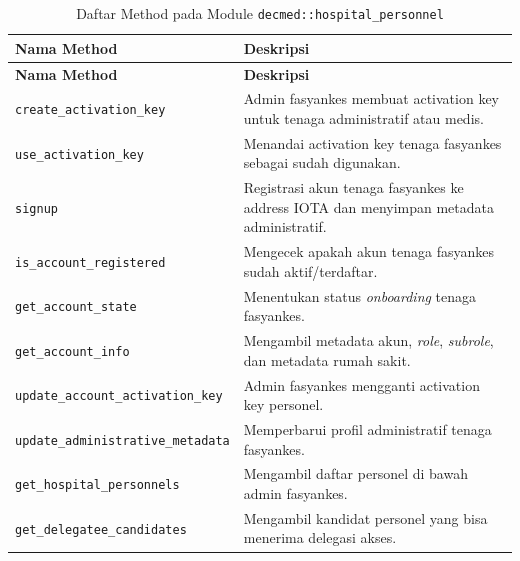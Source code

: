 \begin{longtable}{|Y{0.45\textwidth}|Y{0.47\textwidth}|}
	\caption{Daftar Method pada Module \texttt{decmed::hospital\_personnel}}
	\label{tab:daftar-method-decmed-hospital-personnel}                                                                                \\
	\hline
	\textbf{Nama Method}                      & \textbf{Deskripsi}                                                                     \\
	\hline
	\endfirsthead
	\hline
	\textbf{Nama Method}                      & \textbf{Deskripsi}                                                                     \\
	\hline
	\endhead

	\texttt{create\_activation\_key}          & Admin fasyankes membuat activation key untuk tenaga administratif atau medis.          \\ \hline
	\texttt{use\_activation\_key}             & Menandai activation key tenaga fasyankes sebagai sudah digunakan.                      \\ \hline
	\texttt{signup}                           & Registrasi akun tenaga fasyankes ke address IOTA dan menyimpan metadata administratif. \\ \hline
	\texttt{is\_account\_registered}          & Mengecek apakah akun tenaga fasyankes sudah aktif/terdaftar.                           \\ \hline
	\texttt{get\_account\_state}              & Menentukan status \textit{onboarding} tenaga fasyankes.                                \\ \hline
	\texttt{get\_account\_info}               & Mengambil metadata akun, \textit{role}, \textit{subrole}, dan metadata rumah sakit.    \\ \hline
	\texttt{update\_account\_activation\_key} & Admin fasyankes mengganti activation key personel.                                     \\ \hline
	\texttt{update\_administrative\_metadata} & Memperbarui profil administratif tenaga fasyankes.                                     \\ \hline
	\texttt{get\_hospital\_personnels}        & Mengambil daftar personel di bawah admin fasyankes.                                    \\ \hline
	\texttt{get\_delegatee\_candidates}       & Mengambil kandidat personel yang bisa menerima delegasi akses.                         \\ \hline

\end{longtable}
